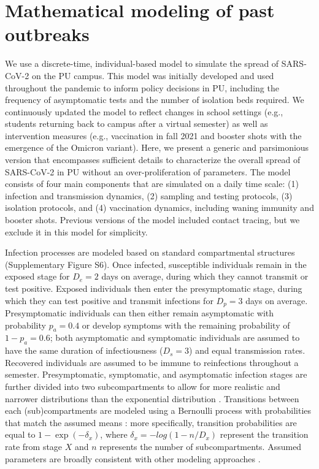 \documentclass[12pt]{article}
\begin{document}
\section*{Mathematical modeling of past outbreaks}

We use a discrete-time, individual-based model to simulate the spread of SARS-CoV-2 on the PU campus.
This model was initially developed and used throughout the pandemic to inform policy decisions in PU, including the frequency of asymptomatic tests and the number of isolation beds required.
We continuously updated the model to reflect changes in school settings (e.g., students returning back to campus after a virtual semester) as well as intervention measures (e.g., vaccination in fall 2021 and booster shots with the emergence of the Omicron variant).
Here, we present a generic and parsimonious version that encompasses sufficient details to characterize the overall spread of SARS-CoV-2 in PU without an over-proliferation of parameters.
The model consists of four main components that are simulated on a daily time scale: (1) infection and transmission dynamics, (2) sampling and testing protocols, (3) isolation protocols, and (4) vaccination dynamics, including waning immunity and booster shots.
Previous versions of the model included contact tracing, but we exclude it in this model for simplicity.

Infection processes are modeled based on standard compartmental structures (Supplementary Figure S6).
Once infected, susceptible individuals remain in the exposed stage for $D_e = 2$ days on average, during which they cannot transmit or test positive. 
Exposed individuals then enter the presymptomatic stage, during which they can test positive and transmit infections for $D_p = 3$ days on average.
Presymptomatic individuals can then either remain asymptomatic with probability $p_a = 0.4$ or develop symptoms with the remaining probability of $1-p_a = 0.6$; both asymptomatic and symptomatic individuals are assumed to have the same duration of infectiousness ($D_s=3$) and equal transmission rates.
Recovered individuals are assumed to be immune to reinfections throughout a semester.
Presymptomatic, symptomatic, and asymptomatic infection stages are further divided into two subcompartments to allow for more realistic and narrower distributions than the exponential distribution \citep{brett2020transmission}.
Transitions between each (sub)compartments are modeled using a Bernoulli process with probabilities that match the assumed means \citep{he2010plug}:
more specifically, transition probabilities are equal to $1 - \exp(-\delta_x)$, where $\delta_x = -log(1-n/D_x)$ represent the transition rate from stage $X$ and $n$ represents the number of subcompartments.
Assumed parameters are broadly consistent with other modeling approaches  \citep{brett2020transmission,lavezzo2020suppression}.
\end{document}
